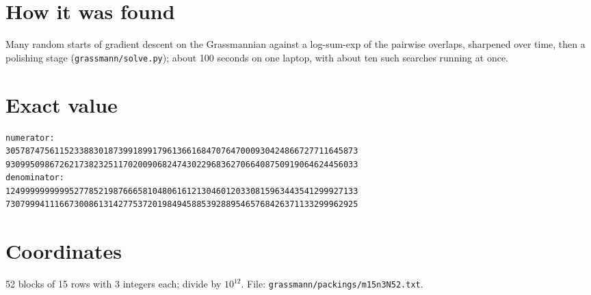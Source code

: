 \documentclass[11pt,a4paper]{article}
\begin{document}
\section{How it was found}
Many random starts of gradient descent on the Grassmannian against a log-sum-exp of the pairwise overlaps, sharpened over time, then a polishing stage (\texttt{grassmann/solve.py}); about 100 seconds on one laptop, with about ten such searches running at once.


\appendix
\section{Exact value}
{\small
\begin{verbatim}
numerator:
305787475611523388301873991899179613661684707647000930424866727711645873
930995098672621738232511702009068247430229683627066408750919064624456033
denominator:
124999999999952778521987666581048061612130460120330815963443541299927133
730799941116673008613142775372019849458853928895465768426371133299962925
\end{verbatim}}

\section{Coordinates}
52 blocks of 15 rows with 3 integers each; divide by $10^{12}$. File: \texttt{grassmann/packings/m15n3N52.txt}.
{\tiny
\begin{multicols}{3}
\end{multicols}}
\end{document}
